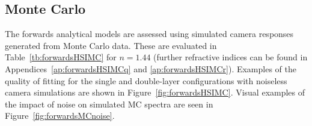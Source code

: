 \subsection{Monte Carlo}\label{sec:MCHSI}
The forwards analytical models are assessed using simulated camera responses generated from Monte Carlo data. 
These are evaluated in Table~\ref{tb:forwardsHSIMC} for $n=1.44$ (further refractive indices can be found in Appendices~\ref{ap:forwardsHSIMCq} and \ref{ap:forwardsHSIMCr}). Examples of the quality of fitting for the single and double-layer configurations with noiseless camera simulations are shown in Figure~\ref{fig:forwardsHSIMC}. Visual examples of the impact of noise on simulated MC spectra are seen in Figure~\ref{fig:forwardsMCnoise}.

